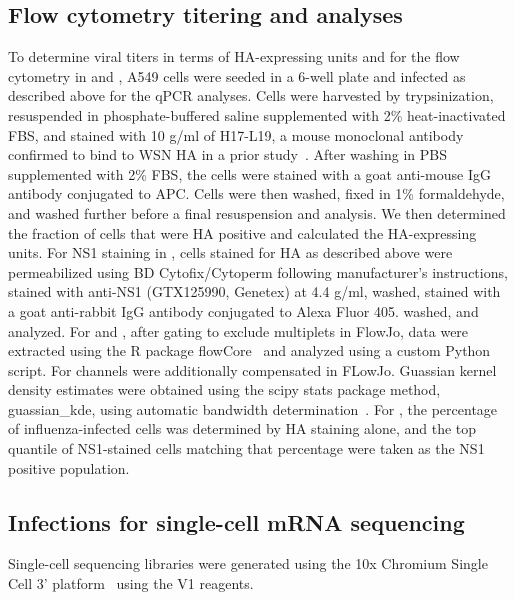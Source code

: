 \documentclass[9pt,lineno]{elife}
\begin{document}
\subsection{Flow cytometry titering and analyses}
To determine viral titers in terms of HA-expressing units and for the flow cytometry in  and , A549 cells were seeded in a 6-well plate and infected as described above for the qPCR analyses.
Cells were harvested by trypsinization, resuspended in phosphate-buffered saline supplemented with 2\% heat-inactivated FBS, and stained with 10 \si{\micro}g/ml of H17-L19, a mouse monoclonal antibody confirmed to bind to WSN HA in a prior study~\citep{Doud:2017bw}.
After washing in PBS supplemented with 2\% FBS, the cells were stained with a goat anti-mouse IgG antibody conjugated to APC.
Cells were then washed, fixed in 1\% formaldehyde, and washed further before a final resuspension and analysis. 
We then determined the fraction of cells that were HA positive and calculated the HA-expressing units.
For NS1 staining in , cells stained for HA as described above were permeabilized using BD Cytofix/Cytoperm following manufacturer's instructions, stained with anti-NS1 (GTX125990, Genetex) at 4.4 \si{\micro}g/ml, washed,  stained with a  goat anti-rabbit IgG antibody conjugated to Alexa Fluor 405. washed, and analyzed.
For  and , after gating to exclude multiplets in FlowJo, data were extracted using the R package flowCore~\citep{LeMeur:2007uo} and analyzed using a custom Python script.
For  channels were additionally compensated in FLowJo.
Guassian kernel density estimates were obtained using the scipy stats package method, guassian\_kde, using automatic bandwidth determination~\citep{vanderWalt:2017dp}.
For , the percentage of influenza-infected cells was determined by HA staining alone, and the top quantile of NS1-stained cells matching that percentage were taken as the NS1 positive population.

\subsection{Infections for single-cell mRNA sequencing}
Single-cell sequencing libraries were generated using the 10x Chromium Single Cell 3' platform~\citep{zheng2017massively} using the V1 reagents.
\end{document}
